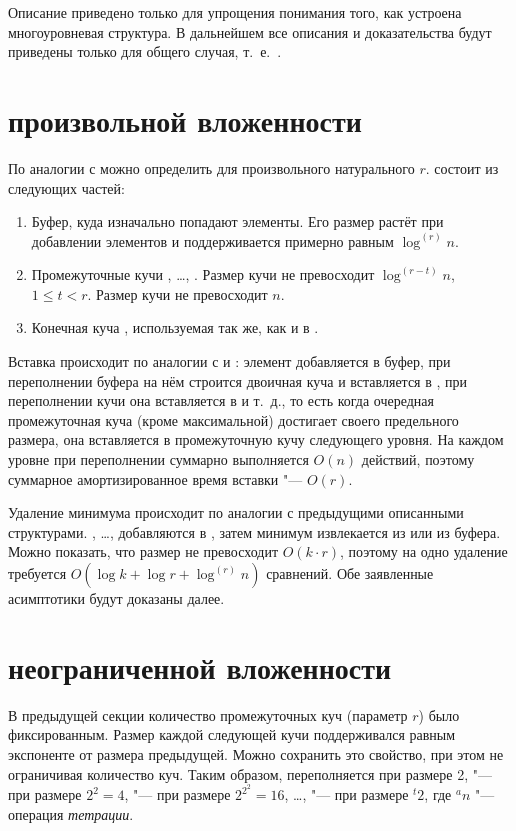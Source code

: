 Описание \CH[2] приведено только для упрощения понимания того, как
устроена многоуровневая структура. В дальнейшем все описания и доказательства
будут приведены только для общего случая, т.~е.~\CH[r].

\section{\CH произвольной вложенности}
По аналогии с \CH[2] можно определить \CH[r] для произвольного натурального $r$.  
\CH[r] состоит из следующих частей:

\begin{enumerate}
\item Буфер, куда изначально попадают элементы. Его размер растёт при добавлении
    элементов и поддерживается примерно равным $\log^{(r)} n$.
\item Промежуточные кучи \MH[1], \dots, \MH[r]. Размер кучи \MH[t] не превосходит
    $\log^{(r-t)} n$, $1 \leq t < r$. Размер кучи \MH[r] не превосходит $n$.
\item Конечная куча \HH, используемая так же, как и в \SCH.
\end{enumerate}

Вставка происходит по аналогии с \SCH и \CH[2]: элемент добавляется в буфер,
при переполнении буфера на нём строится двоичная куча и вставляется в \MH[1],
при переполнении кучи \MH[1] она вставляется в \MH[2] и т.~д., то есть
когда очередная промежуточная куча (кроме максимальной) достигает своего предельного
размера, она вставляется в промежуточную кучу следующего уровня.
На каждом уровне при переполнении суммарно выполняется $O(n)$ действий,
поэтому суммарное амортизированное время вставки "--- $O(r)$.

Удаление минимума происходит по аналогии с предыдущими описанными структурами.
\MH[1], \dots, \MH[r] добавляются в \HH, затем минимум извлекается из \HH
или из буфера. Можно показать, что размер \HH не превосходит
$O(k \cdot r)$, поэтому на одно удаление требуется $O(\log k + \log r + \log^{(r)} n)$
сравнений. Обе заявленные асимптотики будут доказаны далее.

\section{\CH неограниченной вложенности}

В предыдущей секции количество промежуточных куч (параметр $r$) было фиксированным.
Размер каждой следующей кучи поддерживался равным экспоненте от размера
предыдущей. Можно сохранить это свойство, при этом не ограничивая количество куч.
Таким образом, \MH[1] переполняется при размере 2, \MH[2] "--- при размере $2^2 = 4$,
\MH[3] "--- при размере $2^{2^2} = 16$, \dots, \MH[t] "--- при размере ${}^{t}2$,
где ${}^{a}n$ "--- операция \emph{тетрации}.

